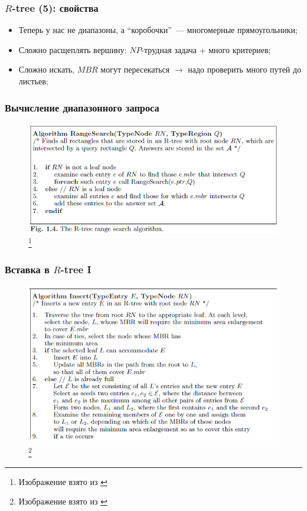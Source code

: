 \documentclass{beamer}
\begin{document}
\begin{frame}
\frametitle{$R$-tree (5): свойства}
\begin{itemize}
  \setlength\itemsep{1em}
  \item Теперь у нас не диапазоны, а ``коробочки''~--- многомерные прямоугольники;
  \item Сложно расщеплять вершину: $NP$-трудная задача + много критериев;
  \item Сложно искать, $MBR$ могут пересекаться $\rightarrow$ надо проверить много путей до листьев;
\end{itemize}

\end{frame}

\begin{frame}
\frametitle{Вычисление диапазонного запроса}

\begin{figure}[htb]
\includegraphics[width=\textwidth,height=0.8\textheight,keepaspectratio]{range.png} 
\footnote{\tiny{Изображение взято из \cite{Manolopoulos2005}}}
\end{figure}   

\end{frame}

\begin{frame}
\frametitle{Вставка в $R$-tree I}

\begin{figure}[htb]
\includegraphics[width=\textwidth,height=0.8\textheight,keepaspectratio]{insert3.png} 
\footnote{\tiny{Изображение взято из \cite{Manolopoulos2005}}}
\end{figure}   

\end{frame}
\end{document}
